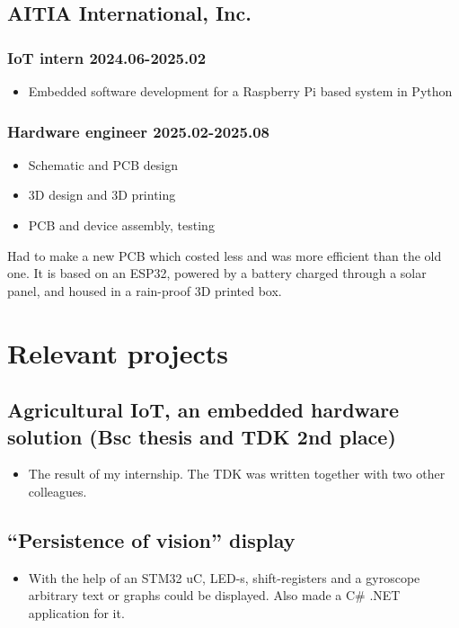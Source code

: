 \documentclass{article}
\newcommand{\rside}[1]{\hfill \normalfont\scshape\MakeLowercase{#1}}
\begin{document}
\subsection{AITIA International, Inc.}
\subsubsection{IoT intern \rside{2024.06-2025.02}}
\begin{itemize}
  \item Embedded software development for a Raspberry Pi based system in Python
\end{itemize}
\subsubsection{Hardware engineer \rside{2025.02-2025.08}}
\begin{itemize}
  \item Schematic and PCB design
  \item 3D design and 3D printing 
  \item PCB and device assembly, testing
\end{itemize}
Had to make a new PCB which costed less and was more efficient than the old one. It is based on an ESP32, powered by a battery charged through a solar panel, and housed in a rain-proof 3D printed box.
\section{\faFlask\enspace Relevant projects}

\subsection{Agricultural IoT, an embedded hardware solution (Bsc thesis and TDK 2nd place)}
\begin{itemize}
  \item The result of my internship. The TDK was written together with two other colleagues.
\end{itemize}

\subsection{\enquote{Persistence of vision} display}
\begin{itemize}
  \item With the help of an STM32 uC, LED-s, shift-registers and a gyroscope arbitrary text or graphs could be displayed. Also made a C\# .NET application for it.
\end{itemize}
\end{document}
